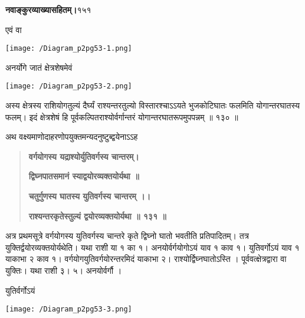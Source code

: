 \documentclass[11pt, openany]{book}
\begin{document}
\onehalfspacing
\hspace{2in}\textbf{नवाङ्कुरव्याख्यासहितम्।}\hspace{2in}१५१

\vspace{5mm}

\begin{sloppypar}
\hangindent=0.2in एवं वा
\begin{center}
    \texttt{[image: /Diagram\_p2pg53-1.png]}
\end{center}
\hangindent=0.2in अनर्योगे जातं क्षेत्रशेषमेवं

\begin{center}
    \texttt{[image: /Diagram\_p2pg53-2.png]}
\end{center}

\hangindent=0.2in \hspace{0.2in}अस्य क्षेत्रस्य राशियोगतुल्यं दैर्घ्यं राश्यन्तरतुल्यो विस्तारश्चाऽऽयते भुजकोटिघातः फलमिति योगान्तरघातस्य फलम्। इदं क्षेत्रशेषं हि पूर्वकल्पितराश्योर्वर्गान्तरं योगान्तरघातरूपमुपपन्नम् ॥ १३० ॥

\hangindent=0.2in \hspace{0.2in}अथ वक्ष्यमाणोदाहरणोपयुक्तमन्यदनुष्टुब्द्वयेनाऽऽह\textendash

\begin{quote}
\hspace{1in}\textbf{वर्गयोगस्य यद्राश्योर्युतिवर्गस्य चान्तरम्।}

\hspace{1in}\textbf{द्विघ्नपातसमानं स्याद्वयोरव्यक्तयोर्यथा ॥}

\hspace{1in}\textbf{चतुर्गुणस्य घातस्य युतिवर्गस्य चान्तरम् ।।}

\hspace{1in}\textbf{राश्यन्तरकृतेस्तुल्यं द्वयोरव्यक्तयोर्यथा ॥ १३१ ॥}
\end{quote}

\hangindent=0.2in \hspace{0.2in}अत्र प्रथमसूत्रे वर्गयोगस्य युतिवर्गस्य चान्तरे कृते द्विघ्नो घातो भवतीति प्रतिपादितम्। तत्र युक्तिर्द्वयोरव्यक्तयोर्यथेति। यथा राशी या १ का १। अनयोर्वर्गयोगोऽयं याव १ काव १। युतिवर्गोऽयं याव १ याकाभा २ काव १। वर्गयोगयुतिवर्गयोरन्तरमिदं याकाभा २। राश्योर्द्विघ्नघातोऽस्ति । पूर्ववत्क्षेत्रद्वारा वा युक्तिः। यथा राशी ३। ५। अनयोर्वर्गौ । 

\hangindent=0.2in \hspace{0.2in}युतिर्वर्गोऽयं
\begin{center}
    \texttt{[image: /Diagram\_p2pg53-3.png]}
\end{center}
\end{sloppypar}
\thispagestyle{empty}
\newpage
\end{document}
